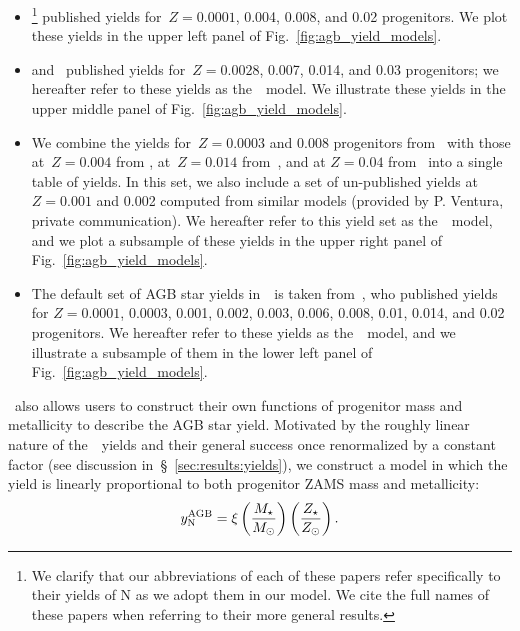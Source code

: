 \documentclass[ms.tex]{subfiles}
\begin{document}
\begin{itemize}
	\item[\textbf{1.}] \citet[][hereafter~\karakasten]{Karakas2010}\footnote{
		We clarify that our abbreviations of each of these papers refer
		specifically to their yields of N as we adopt them in our model.
		We cite the full names of these papers when referring to their more
		general results.
	} published yields for~$Z = 0.0001$, 0.004, 0.008, and 0.02 progenitors.
	We plot these yields in the upper left panel of 
	Fig.~\ref{fig:agb_yield_models}.

	\item[\textbf{2.}] \citet{Karakas2016} and~\citet{Karakas2018} published
	yields for~$Z = 0.0028$, 0.007, 0.014, and 0.03 progenitors; we hereafter
	refer to these yields as the~\karakas~model.
	We illustrate these yields in the upper middle panel of
	Fig.~\ref{fig:agb_yield_models}.

	\item[\textbf{3.}] We combine the yields for~$Z = 0.0003$ and 0.008
	progenitors from~\citet{Ventura2013} with those at~$Z = 0.004$ from
	\citet{Ventura2014}, at~$Z = 0.014$ from~\citet{Ventura2018}, and at
	$Z = 0.04$ from~\citet{Ventura2020} into a single table of yields.
	In this set, we also include a set of un-published yields at~$Z = 0.001$
	and 0.002 computed from similar models (provided by P. Ventura, private
	communication).
	We hereafter refer to this yield set as the~\ventura~model, and we plot a
	subsample of these yields in the upper right panel of
	Fig.~\ref{fig:agb_yield_models}.

	\item[\textbf{4.}] The default set of AGB star yields in~\vice~is taken
	from~\citet{Cristallo2011, Cristallo2015}, who published yields for
	$Z = 0.0001$, 0.0003, 0.001, 0.002, 0.003, 0.006, 0.008, 0.01, 0.014, and
	0.02 progenitors.
	We hereafter refer to these yields as the~\cristallo~model, and we
	illustrate a subsample of them in the lower left panel of
	Fig.~\ref{fig:agb_yield_models}.
\end{itemize}
\par
\vice~also allows users to construct their own functions of progenitor mass
and metallicity to describe the AGB star yield.
Motivated by the roughly linear nature of the~\cristallo~yields and their
general success once renormalized by a constant factor (see discussion
in~\S~\ref{sec:results:yields}), we construct a model in which the yield is
linearly proportional to both progenitor ZAMS mass and metallicity:
\begin{equation}
y_\text{N}^\text{AGB} = \xi \left(\frac{M_\star}{M_\odot}\right)
\left(\frac{Z_\star}{Z_\odot}\right).
\label{eq:linear_yield}
\end{equation}
\end{document}
